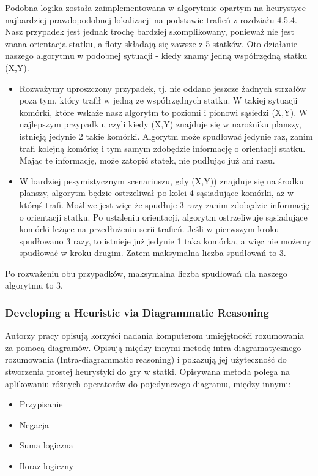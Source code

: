 Podobna logika została zaimplementowana w algorytmie opartym na heurystyce najbardziej prawdopodobnej lokalizacji na
podstawie trafień z rozdziału 4.5.4. Nasz przypadek jest jednak trochę bardziej skomplikowany, ponieważ nie jest znana orientacja statku, a floty składają się zawsze z 5 statków. Oto działanie naszego algorytmu w podobnej sytuacji - kiedy znamy jedną współrzędną statku (X,Y).

\begin{itemize}
\item Rozważymy uproszczony przypadek, tj. nie oddano jeszcze żadnych strzałów poza tym, który trafił w jedną ze współrzędnych statku. W takiej sytuacji komórki, które wskaże nasz algorytm to poziomi i pionowi sąsiedzi (X,Y). W najlepszym przypadku, czyli kiedy (X,Y) znajduje się w narożniku planszy, istnieją jedynie 2 takie komórki. Algorytm może spudłować jedynie raz, zanim trafi kolejną komórkę i tym samym zdobędzie informację o orientacji statku. Mając te informację, może zatopić statek, nie pudłując już ani razu.

\item W bardziej pesymistycznym scenariuszu, gdy (X,Y)) znajduje się na środku planszy, algorytm będzie ostrzeliwał po kolei 4 sąsiadujące komórki, aż w którąś trafi. Możliwe jest więc że spudłuje 3 razy zanim zdobędzie informację o orientacji statku. Po ustaleniu orientacji, algorytm ostrzeliwuje sąsiadujące komórki leżące na przedłużeniu serii trafień. Jeśli w pierwszym kroku spudłowano 3 razy, to istnieje już jedynie 1 taka komórka, a więc nie możemy spudłować w kroku drugim. Zatem maksymalna liczba spudłowań to 3.
\end{itemize}

Po rozważeniu obu przypadków, maksymalna liczba spudłowań dla naszego algorytmu to 3.


\subsubsection{Developing a Heuristic via Diagrammatic Reasoning \cite{anderson1995developing}}

Autorzy pracy opisują korzyści nadania komputerom umiejętnośći rozumowania za pomocą diagramów. Opisują między innymi metodę intra-diagramatycznego rozumowania (Intra-diagrammatic reasoning) i pokazują jej użyteczność do stworzenia prostej heurystyki do gry w statki. Opisywana metoda polega na aplikowaniu różnych operatorów do pojedynczego diagramu, między innymi:
\begin{itemize}
    \item Przypisanie
    \item Negacja
    \item Suma logiczna
    \item Iloraz logiczny
\end{itemize}


